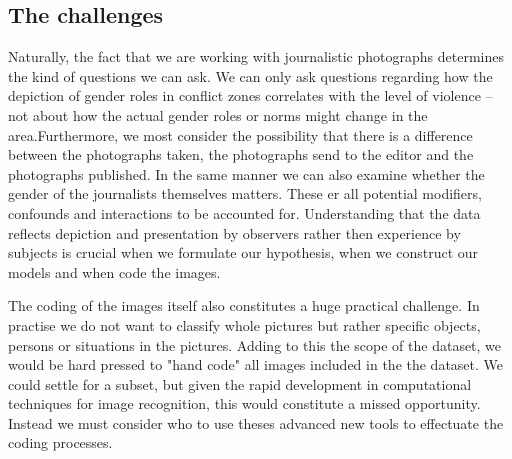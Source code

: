 \documentclass[a4paper]{article}
\begin{document}
\subsection{The challenges}

Naturally, the fact that we are working with journalistic photographs determines the kind of questions we can ask. We can only ask questions regarding how the depiction of gender roles in conflict zones correlates with the level of violence -- not about how the actual gender roles or norms might change in the area.Furthermore, we most consider the possibility that there is a difference between the photographs taken, the photographs send to the editor and the photographs published. In the same manner we can also examine whether the gender of the journalists themselves matters. These er all potential modifiers, confounds and interactions to be accounted for. Understanding that the data reflects depiction and presentation by observers rather then experience by subjects is crucial when we formulate our hypothesis, when we construct our models and when code the images.\par

The coding of the images itself also constitutes a huge practical challenge. In practise we do not want to classify whole pictures but rather specific objects, persons or situations in the pictures. Adding to this the scope of the dataset, we would be hard pressed to "hand code" all images included in the the dataset. We could settle for a subset, but given the rapid development in computational techniques for image recognition, this would constitute a missed opportunity. Instead we must consider who to use theses advanced new tools to effectuate the coding processes.\par 
\end{document}
